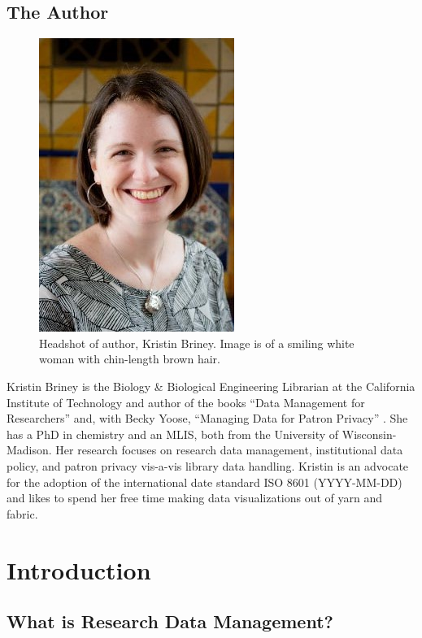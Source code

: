 \documentclass[
]{book}
\begin{document}
\hypertarget{the-author}{%
\section*{The Author}\label{the-author}}

\begin{figure}
\centering
\includegraphics{images/00_KristinBriney.jpg}
\caption{Headshot of author, Kristin Briney. Image is of a smiling white woman with chin-length brown hair.}
\end{figure}

Kristin Briney is the Biology \& Biological Engineering Librarian at the California Institute of Technology and author of the books ``Data Management for Researchers'' \citep{briney_data_2015} and, with Becky Yoose, ``Managing Data for Patron Privacy'' \citep{briney_managing_2022}. She has a PhD in chemistry and an MLIS, both from the University of Wisconsin-Madison. Her research focuses on research data management, institutional data policy, and patron privacy vis-a-vis library data handling. Kristin is an advocate for the adoption of the international date standard ISO 8601 (YYYY-MM-DD) and likes to spend her free time making data visualizations out of yarn and fabric.

\hypertarget{introduction}{%
\chapter{Introduction}\label{introduction}}

\hypertarget{what-rdm}{%
\section{What is Research Data Management?}\label{what-rdm}}
\end{document}
